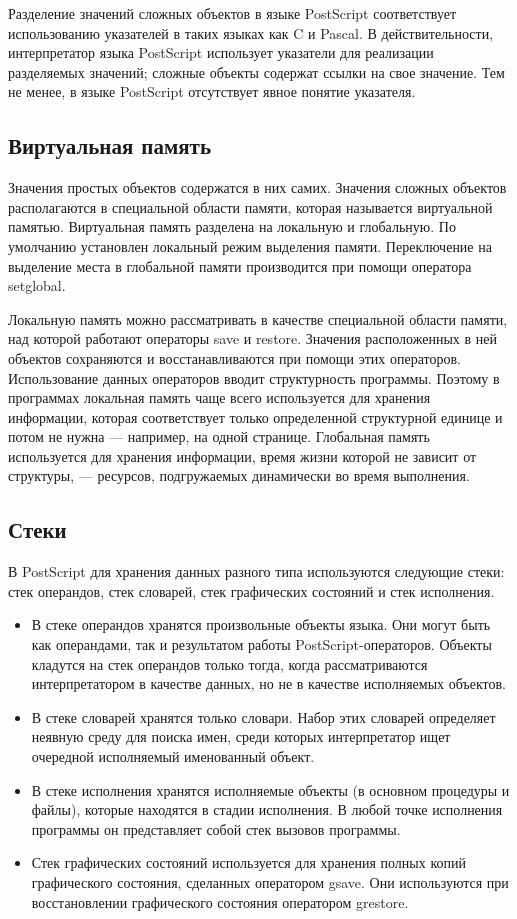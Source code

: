 \documentclass[14pt]{extarticle}
\begin{document}
Разделение значений сложных объектов в языке PostScript соответствует использованию указателей в таких языках как C и Pascal. В действительности, интерпретатор языка PostScript использует указатели для реализации разделяемых значений; сложные объекты содержат ссылки на свое значение. Тем не менее, в языке PostScript отсутствует явное понятие указателя.


\subsection{Виртуальная память}

Значения простых объектов содержатся в них самих. Значения сложных объектов располагаются в специальной области памяти, которая называется виртуальной памятью. Виртуальная память разделена на локальную и глобальную. По умолчанию установлен локальный режим выделения памяти. Переключение на выделение места в глобальной памяти производится при помощи оператора setglobal.

Локальную память можно рассматривать в качестве специальной области памяти, над которой работают операторы save и restore. Значения расположенных в ней объектов сохраняются и восстанавливаются при помощи этих операторов. Использование данных операторов вводит структурность программы. Поэтому в программах локальная память чаще всего используется для хранения информации, которая соответствует только определенной структурной единице и потом не нужна --- например, на одной странице.  Глобальная память используется для хранения информации, время жизни которой не зависит от структуры, --- ресурсов, подгружаемых динамически во время выполнения.


\subsection{Стеки}

В PostScript для хранения данных разного типа используются следующие стеки: стек операндов, стек словарей, стек графических состояний и стек исполнения. 
\begin{itemize}
\item В стеке операндов хранятся произвольные объекты языка. Они могут быть как операндами, так и результатом работы PostScript-операторов. Объекты кладутся на стек операндов только тогда, когда рассматриваются интерпретатором в качестве данных, но не в качестве исполняемых объектов.
\item 	В стеке словарей хранятся только словари. Набор этих словарей определяет неявную среду для поиска имен, среди которых интерпретатор ищет очередной исполняемый именованный объект.
\item 	В стеке исполнения хранятся исполняемые объекты (в основном процедуры и файлы), которые находятся в стадии исполнения. В любой точке исполнения программы он представляет собой стек вызовов программы.
\item 	Стек графических состояний используется для хранения полных копий графического состояния, сделанных оператором gsave. Они используются при восстановлении графического состояния оператором grestore.
\end{itemize}
\end{document}
